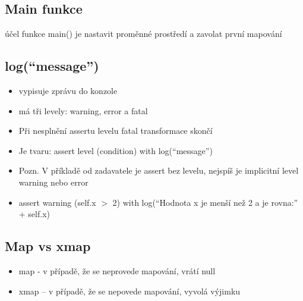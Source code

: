 \documentclass[11pt,a4paper]{article}   	%
\begin{document}
\subsection {Main funkce}
účel funkce main() je nastavit proměnné prostředí a zavolat první mapování


\subsection{log(“message”)}
\begin{itemize}
	\item	vypisuje zprávu do konzole
	\item	má tři levely: warning, error a fatal
	\item	Při nesplnění assertu levelu fatal transformace skončí
	\item	Je tvaru: assert level (condition) with log(“message”)
	\item	Pozn. V příkladě od zadavatele je assert bez levelu, nejspíš je implicitní level warning nebo error
	\item 	assert warning (self.x $>$ 2) with log(“Hodnota x je menší než 2 a je
	rovna:” + self.x)
\end{itemize}

\subsection {Map vs xmap}
\begin{itemize}
  	\item	map - v případě, že se neprovede mapování, vrátí null
  	\item	xmap – v případě, že se nepovede mapování, vyvolá výjimku
\end{itemize}
\end{document}
